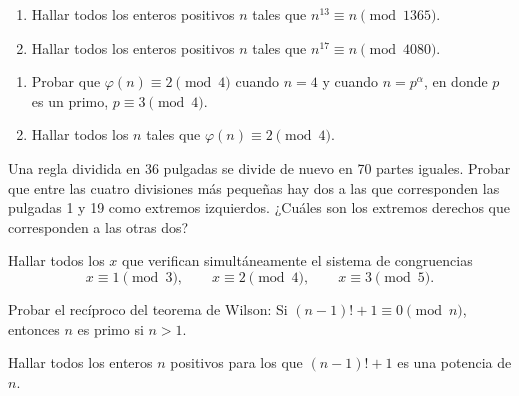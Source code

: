 \documentclass[12pt,a4paper]{book}
\begin{document}
    \begin{ejercicio}
        \begin{enumerate}
            \item[(a)] Hallar todos los enteros positivos $n$ tales que
            $n^{13}\equiv n\pmod{1365}$.
            \item[(b)] Hallar todos los enteros positivos $n$ tales que
            $n^{17}\equiv n\pmod{4080}$.
        \end{enumerate}
    \end{ejercicio}

    \begin{ejercicio}
        \begin{enumerate}
            \item[(a)] Probar que $\varphi(n)\equiv2\pmod{4}$ cuando $n=4$ y cuando
            $n=p^{\alpha}$, en donde $p$ es un primo, $p\equiv3\pmod{4}$.
            \item[(b)] Hallar todos los $n$ tales que $\varphi(n)\equiv2\pmod{4}$.
        \end{enumerate}
    \end{ejercicio}

    \begin{ejercicio}
        Una regla dividida en 36 pulgadas se divide de nuevo en 70 partes iguales. Probar
        que entre las cuatro divisiones más pequeñas hay dos a las que corresponden las
        pulgadas 1 y 19 como extremos izquierdos. ¿Cuáles son los extremos derechos que
        corresponden a las otras dos?
    \end{ejercicio}

    \begin{ejercicio}
        Hallar todos los $x$ que verifican simultáneamente el sistema de congruencias
        \begin{equation*}
            x\equiv1\pmod{3},\qquad x\equiv2\pmod{4},\qquad x\equiv3\pmod{5}.
        \end{equation*}
    \end{ejercicio}

    \begin{ejercicio}
        Probar el recíproco del teorema de Wilson: Si $(n-1)!+1\equiv0\pmod{n}$, entonces
        $n$ es primo si $n>1$.
    \end{ejercicio}

    \begin{ejercicio}
        Hallar todos los enteros $n$ positivos para los que $(n-1)!+1$ es una potencia de
        $n$.
    \end{ejercicio}
\end{document}
